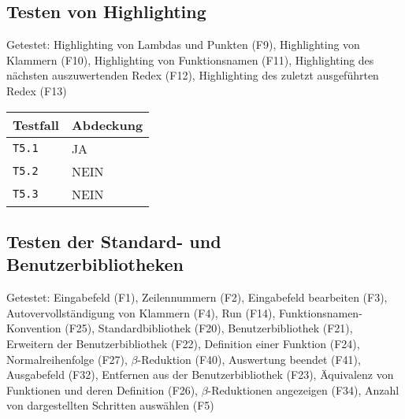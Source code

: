 \documentclass[parskip=full,11pt,twoside]{scrartcl}
\begin{document}
\subsection{Testen von Highlighting}
    Getestet:
    Highlighting von Lambdas und Punkten (F9),
    Highlighting von Klammern (F10),
    Highlighting von Funktionsnamen (F11),
    Highlighting des nächsten auszuwertenden Redex (F12),
    Highlighting des zuletzt ausgeführten Redex (F13)
    
    \label{shortcuts}
    \begin{center}
        \begin{tabular}{ p{9cm} p{4cm}}
            Testfall & Abdeckung \\ \hline
            \texttt{T5.1} & \cellcolor{green!20}JA \\ \hline
            \texttt{T5.2} & \cellcolor{red!20}NEIN \\ \hline
            \texttt{T5.3} & \cellcolor{red!20}NEIN \\ \hline
        \end{tabular}
    \end{center}

\subsection{Testen der Standard- und Benutzerbibliotheken}
    Getestet:
    Eingabefeld (F1),
    Zeilennummern (F2),
    Eingabefeld bearbeiten (F3),
    Autovervollständigung von Klammern (F4),
    Run (F14),
    Funktionsnamen-Konvention (F25),
    Standardbibliothek (F20),
    Benutzerbibliothek (F21),
    Erweitern der Benutzerbibliothek (F22),
    Definition einer Funktion (F24),
    Normalreihenfolge (F27),
    $\beta$-Reduktion (F40),
    Auswertung beendet (F41),
    Ausgabefeld (F32),
    Entfernen aus der Benutzerbibliothek (F23),
    Äquivalenz von Funktionen und deren Definition (F26),
    $\beta$-Reduktionen angezeigen (F34),
    Anzahl von dargestellten Schritten auswählen (F5)
    
\end{document}
